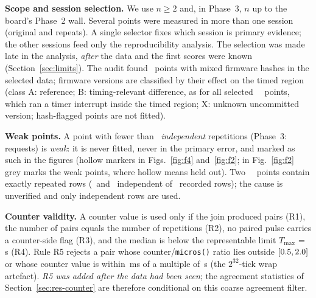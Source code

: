 \textbf{Scope and session selection.} We use $n\ge2$ and, in Phase~3, $n$ up to the board's Phase~2 wall. Several points were measured in more than one session (original and repeats). A single selector fixes which session is primary evidence; the other sessions feed only the reproducibility analysis. The selection was made late in the analysis, \emph{after} the data and the first scores were known (Section~\ref{sec:limits}). The audit found \MixedPoints\ points with mixed firmware hashes in the selected data; firmware versions are classified by their effect on the timed region (class A: reference; B: timing-relevant difference, as for all selected \espA\ \grover\ points, which ran a timer interrupt inside the timed region; X: unknown uncommitted version; hash-flagged points are not fitted).

\textbf{Weak points.} A point with fewer than \WeakMin\ \emph{independent} repetitions (Phase~3: requests) is \emph{weak}: it is never fitted, never in the primary error, and marked as such in the figures (hollow markers in Figs.~\ref{fig:f4} and~\ref{fig:f2}; in Fig.~\ref{fig:f2} grey marks the weak points, where hollow means held out). Two \espB\ \grover\ points contain exactly repeated rows (\DupNineIndep\ and \DupTenIndep\ independent of \DupNineRows\ recorded rows); the cause is unverified and only independent rows are used.

\textbf{Counter validity.} A counter value is used only if the join produced pairs (R1), the number of pairs equals the number of repetitions (R2), no paired pulse carries a counter-side flag (R3), and the median is below the representable limit $T_{\max}$ = \TMaxS\,s (R4). Rule R5 rejects a pair whose counter/\texttt{micros()} ratio lies outside $[0.5,2.0]$ or whose counter value is within \RFiveMs\,ms of a multiple of \WrapS\,s (the $2^{32}$-tick wrap artefact). \emph{R5 was added after the data had been seen}; the agreement statistics of Section~\ref{sec:res-counter} are therefore conditional on this coarse agreement filter.

